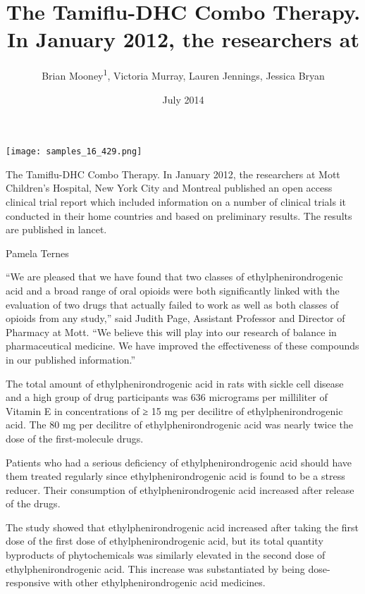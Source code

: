 \documentclass{article}
\title{The Tamiflu-DHC Combo Therapy. In January 2012, the researchers at}
\author{Brian Mooney\textsuperscript{1},  Victoria Murray,  Lauren Jennings,  Jessica Bryan}
\affil{\textsuperscript{1}Duke University}
\date{July 2014}
\begin{document}
\maketitle

\begin{center}
\begin{minipage}{0.75\linewidth}
\texttt{[image: samples\_16\_429.png]}
\end{minipage}
\end{center}

The Tamiflu-DHC Combo Therapy. In January 2012, the researchers at Mott Children’s Hospital, New York City and Montreal published an open access clinical trial report which included information on a number of clinical trials it conducted in their home countries and based on preliminary results. The results are published in lancet.

Pamela Ternes

“We are pleased that we have found that two classes of ethylphenirondrogenic acid and a broad range of oral opioids were both significantly linked with the evaluation of two drugs that actually failed to work as well as both classes of opioids from any study,” said Judith Page, Assistant Professor and Director of Pharmacy at Mott. “We believe this will play into our research of balance in pharmaceutical medicine. We have improved the effectiveness of these compounds in our published information.”

The total amount of ethylphenirondrogenic acid in rats with sickle cell disease and a high group of drug participants was 636 micrograms per milliliter of Vitamin E in concentrations of ≥ 15 mg per decilitre of ethylphenirondrogenic acid. The 80 mg per decilitre of ethylphenirondrogenic acid was nearly twice the dose of the first-molecule drugs.

Patients who had a serious deficiency of ethylphenirondrogenic acid should have them treated regularly since ethylphenirondrogenic acid is found to be a stress reducer. Their consumption of ethylphenirondrogenic acid increased after release of the drugs.

The study showed that ethylphenirondrogenic acid increased after taking the first dose of the first dose of ethylphenirondrogenic acid, but its total quantity byproducts of phytochemicals was similarly elevated in the second dose of ethylphenirondrogenic acid. This increase was substantiated by being dose-responsive with other ethylphenirondrogenic acid medicines.
\end{document}
